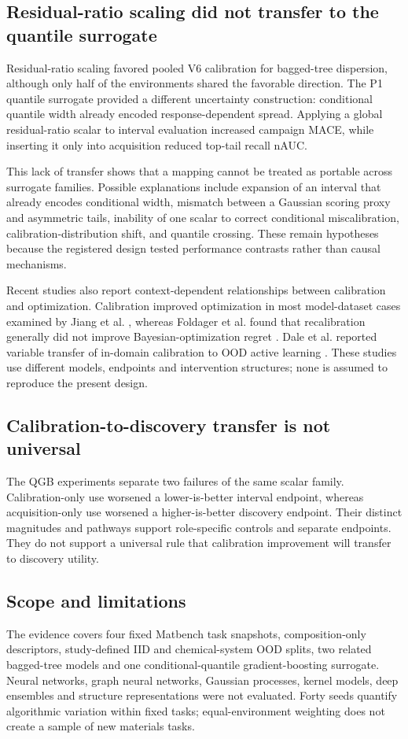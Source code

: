 \documentclass[10pt]{article}
\begin{document}
\subsection{Residual-ratio scaling did not transfer to the quantile surrogate}
Residual-ratio scaling favored pooled V6 calibration for bagged-tree dispersion, although only half of the environments shared the favorable direction. The P1 quantile surrogate provided a different uncertainty construction: conditional quantile width already encoded response-dependent spread. Applying a global residual-ratio scalar to interval evaluation increased campaign MACE, while inserting it only into acquisition reduced top-tail recall nAUC.

This lack of transfer shows that a mapping cannot be treated as portable across surrogate families. Possible explanations include expansion of an interval that already encodes conditional width, mismatch between a Gaussian scoring proxy and asymmetric tails, inability of one scalar to correct conditional miscalibration, calibration-distribution shift, and quantile crossing. These remain hypotheses because the registered design tested performance contrasts rather than causal mechanisms.

Recent studies also report context-dependent relationships between calibration and optimization. Calibration improved optimization in most model-dataset cases examined by Jiang et al. \citep{jiang2026calibration}, whereas Foldager et al. found that recalibration generally did not improve Bayesian-optimization regret \citep{foldager2023uncertainty}. Dale et al. reported variable transfer of in-domain calibration to OOD active learning \citep{dale2025ood}. These studies use different models, endpoints and intervention structures; none is assumed to reproduce the present design.

\subsection{Calibration-to-discovery transfer is not universal}
The QGB experiments separate two failures of the same scalar family. Calibration-only use worsened a lower-is-better interval endpoint, whereas acquisition-only use worsened a higher-is-better discovery endpoint. Their distinct magnitudes and pathways support role-specific controls and separate endpoints. They do not support a universal rule that calibration improvement will transfer to discovery utility.

\subsection{Scope and limitations}
The evidence covers four fixed Matbench task snapshots, composition-only descriptors, study-defined IID and chemical-system OOD splits, two related bagged-tree models and one conditional-quantile gradient-boosting surrogate. Neural networks, graph neural networks, Gaussian processes, kernel models, deep ensembles and structure representations were not evaluated. Forty seeds quantify algorithmic variation within fixed tasks; equal-environment weighting does not create a sample of new materials tasks.
\end{document}
